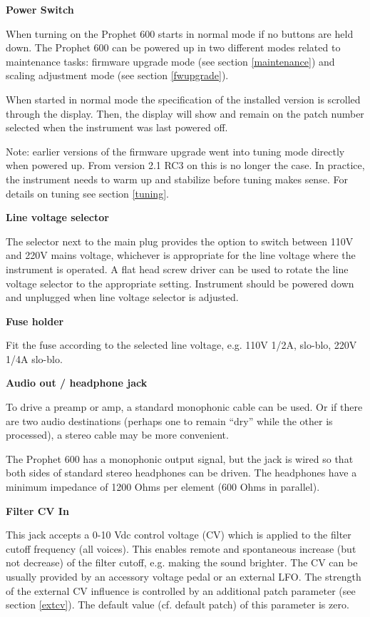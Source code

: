 \textbf{Power Switch}

When turning on the Prophet 600 starts in normal mode if no buttons are held down. The Prophet 600 can be powered up in two different modes related to maintenance tasks: firmware upgrade mode (see section \ref{maintenance}) and scaling adjustment mode (see section \ref{fwupgrade}).  

When started in normal mode the specification of the installed version is scrolled through the display. Then, the display will show and remain on the patch number selected when the instrument was last powered off.

Note: earlier versions of the firmware upgrade went into tuning mode directly when powered up. From version 2.1 RC3 on this is no longer the case. In practice, the instrument needs to warm up and stabilize before tuning makes sense. For details on tuning see section \ref{tuning}.

\textbf{Line voltage selector}

The selector next to the main plug provides the option to switch between 110V and 220V mains voltage, whichever is appropriate for the line voltage where the instrument is operated. A flat head screw driver can be used to rotate the line voltage selector to the appropriate setting. Instrument should be powered down and unplugged when line voltage selector is adjusted.

\textbf{Fuse holder}

Fit the fuse according to the selected line voltage, e.g. 110V 1/2A, slo-blo, 220V 1/4A slo-blo.

\textbf{Audio out / headphone jack}

To drive a preamp or amp, a standard monophonic cable can be used. Or if there are two audio destinations (perhaps one to remain “dry” while the other is processed), a stereo cable may be more convenient.

The Prophet 600 has a monophonic output signal, but the jack is wired so that both sides of standard stereo headphones can be driven. The headphones have a minimum impedance of 1200 Ohms per element (600 Ohms in parallel).

\textbf{Filter CV In}

This jack accepts a 0-10 Vdc control voltage (CV) which is applied to the filter cutoff frequency (all voices). This enables remote and spontaneous increase (but not decrease) of the filter cutoff, e.g. making the sound brighter. The CV can be usually provided by an accessory voltage pedal or an external LFO. The strength of the external CV influence is controlled by an additional patch parameter (see section \ref{extcv}). The default value (cf. default patch) of this parameter is zero. 

